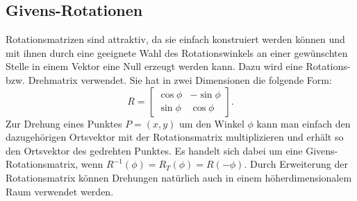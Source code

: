 \subsection{Givens-Rotationen\label{francis:section:grundlagen:givens}}
%
Rotationsmatrizen sind attraktiv, da sie einfach konstruiert werden können und mit ihnen durch eine geeignete Wahl des Rotationswinkels an einer gewünschten Stelle in einem Vektor eine Null erzeugt werden kann.
Dazu wird eine Rotations- bzw. Drehmatrix verwendet.
Sie hat in zwei Dimensionen die folgende Form:
\begin{equation}
	R=\begin{bmatrix}
	\cos\phi & -\sin\phi \\
	\sin\phi & \cos\phi
	\end{bmatrix}.
\end{equation}
Zur Drehung eines Punktes $P=(x,y)$ um den Winkel $\phi$ kann man einfach den dazugehörigen Ortsvektor mit der Rotationsmatrix multiplizieren und erhält so den Ortsvektor des gedrehten Punktes.
Es handelt sich dabei um eine Givens-Rotationsmatrix, wenn $R^{-1}(\phi)=R_{T}(\phi)=R(-\phi)$.
Durch Erweiterung der Rotationsmatrix können Drehungen natürlich auch in einem höherdimensionalem Raum verwendet werden.

